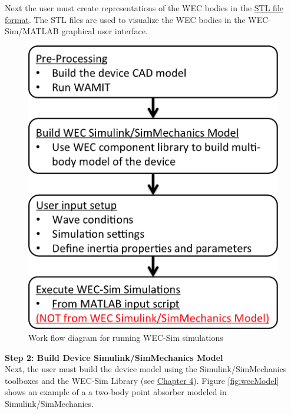Next the user must create representations of the WEC bodies in the \href{http://en.wikipedia.org/wiki/STL_(file_format)}{STL file format}. The STL files are used to visualize the WEC bodies in the WEC-Sim/MATLAB graphical user interface.\\
 
\begin{figure}[H]
\noindent \centering{}\includegraphics[scale=0.65]{gettingStarted/Figures/WECSimWorkflow}\protect\caption{Work flow diagram for running WEC-Sim simulations}
\label{fig: WEC-Sim Workflow}
\end{figure}

\textbf{Step 2: Build Device Simulink/SimMechanics Model}\\
Next, the user must build the device model using the Simulink/SimMechanics toolboxes and the WEC-Sim Library (see \hyperlink{chapter.4}{Chapter 4}). Figure \ref{fig:wecModel}  shows an example of a a two-body point absorber modeled in Simulink/SimMechanics.

